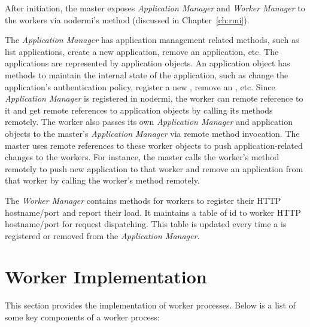 After initiation, the master exposes \emph{Application Manager} and
\emph{Worker Manager} to the workers via nodermi's  method
(discussed in Chapter~\ref{ch:rmi}).

The \emph{Application Manager} has application management related  methods,
such as list applications, create a new application, remove an application,
etc.  The applications are represented by application objects. An application
object has methods to maintain the internal state of the application, such as
change the application's authentication policy, register a new \appins, remove
an \appins, etc.  Since \emph{Application Manager} is registered in nodermi,
the worker can remote reference to it and get remote references to application
objects by calling its methods remotely.
The worker also passes
its own \emph{Application Manager}  and application objects to
the master's \emph{Application Manager} via remote method invocation.  The
master uses remote references to these worker
objects to push application-related changes to the  workers.  For instance,
the master calls  the worker's  method remotely to
push new application to that worker and remove an application from that worker
by calling the worker's  method remotely.

The \emph{Worker Manager} contains methods for workers to register their HTTP
hostname/port and report their load.  It maintains a table of \appins{} id to
worker HTTP hostname/port for request dispatching.  This table is updated
every time a \appins{} is registered or removed from the \emph{Application
Manager}.



\section{Worker Implementation}
\label{sec:worker}

This section provides the implementation of worker processes.
Below is a list of some key components of a worker process:

